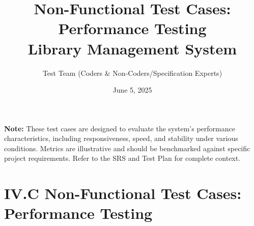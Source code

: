 \documentclass[10pt, a4paper]{report}
\title{Non-Functional Test Cases: Performance Testing \\ \large Library Management System}
\author{Test Team (Coders \& Non-Coders/Specification Experts)}
\date{June 5, 2025}
\begin{document}
\maketitle
\begin{center}
    \textbf{Note:} These test cases are designed to evaluate the system's performance characteristics, including responsiveness, speed, and stability under various conditions. Metrics are illustrative and should be benchmarked against specific project requirements. Refer to the SRS and Test Plan for complete context.
\end{center}

\section*{IV.C Non-Functional Test Cases: Performance Testing}
\end{document}
